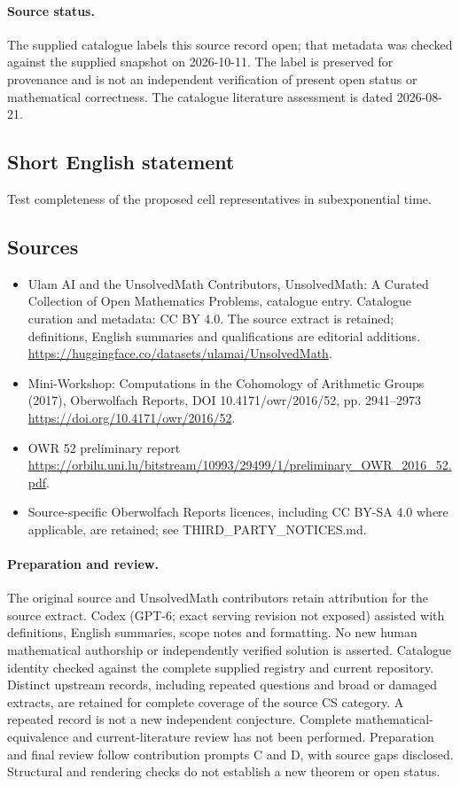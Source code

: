 \documentclass[11pt]{article}
\begin{document}
\paragraph{Source status.}
The supplied catalogue labels this source record open; that metadata was checked against the supplied snapshot on 2026-10-11. The label is preserved for provenance and is not an independent verification of present open status or mathematical correctness. The catalogue literature assessment is dated 2026-08-21.
\subsection{Short English statement}
Test completeness of the proposed cell representatives in subexponential time.
\subsection{Sources}
\begin{itemize}
\item[S1] Ulam AI and the UnsolvedMath Contributors, UnsolvedMath: A Curated Collection of Open Mathematics Problems, catalogue entry. Catalogue curation and metadata: CC BY 4.0. The source extract is retained; definitions, English summaries and qualifications are editorial additions.
\url{https://huggingface.co/datasets/ulamai/UnsolvedMath}.
\item[S2] Mini-Workshop: Computations in the Cohomology of Arithmetic Groups (2017), Oberwolfach Reports, DOI 10.4171/owr/2016/52, pp. 2941--2973
\url{https://doi.org/10.4171/owr/2016/52}.
\item[S3] OWR 52 preliminary report
\url{https://orbilu.uni.lu/bitstream/10993/29499/1/preliminary_OWR_2016_52.pdf}.
\item Source-specific Oberwolfach Reports licences, including CC BY-SA 4.0 where applicable, are retained; see THIRD\_PARTY\_NOTICES.md.
\end{itemize}
\paragraph{Preparation and review.}
The original source and UnsolvedMath contributors retain attribution for the source extract. Codex (GPT-6; exact serving revision not exposed) assisted with definitions, English summaries, scope notes and formatting. No new human mathematical authorship or independently verified solution is asserted. Catalogue identity checked against the complete supplied registry and current repository. Distinct upstream records, including repeated questions and broad or damaged extracts, are retained for complete coverage of the source CS category. A repeated record is not a new independent conjecture. Complete mathematical-equivalence and current-literature review has not been performed. Preparation and final review follow contribution prompts C and D, with source gaps disclosed. Structural and rendering checks do not establish a new theorem or open status.
\label{end:statement}
\end{document}
